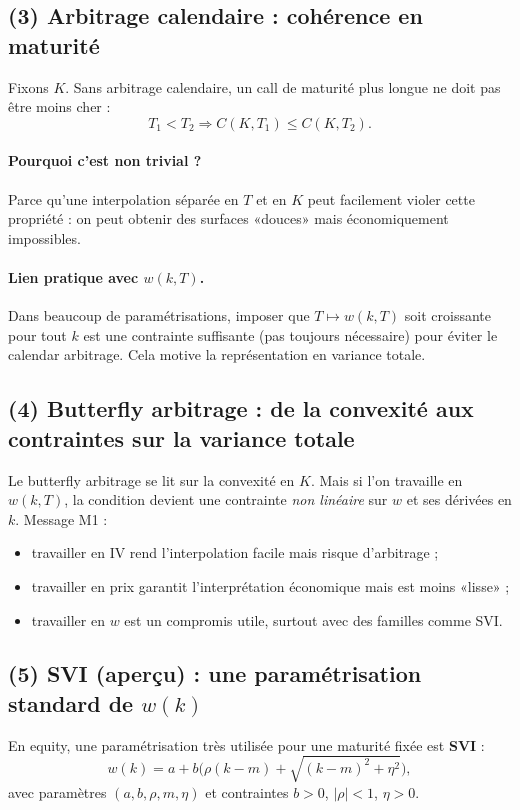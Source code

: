 \subsection*{(3) Arbitrage calendaire : cohérence en maturité}
Fixons $K$.
Sans arbitrage calendaire, un call de maturité plus longue ne doit pas être moins cher :
\[
T_1<T_2 \Rightarrow C(K,T_1)\le C(K,T_2).
\]
\paragraph{Pourquoi c'est non trivial ?}
Parce qu'une interpolation séparée en $T$ et en $K$ peut facilement violer cette propriété : on peut obtenir des surfaces «douces» mais économiquement impossibles.
\paragraph{Lien pratique avec $w(k,T)$.}
Dans beaucoup de paramétrisations, imposer que $T\mapsto w(k,T)$ soit croissante pour tout $k$ est une contrainte suffisante (pas toujours nécessaire) pour éviter le calendar arbitrage.
Cela motive la représentation en variance totale.

\subsection*{(4) Butterfly arbitrage : de la convexité aux contraintes sur la variance totale}
Le butterfly arbitrage se lit sur la convexité en $K$.
Mais si l'on travaille en $w(k,T)$, la condition devient une contrainte \emph{non linéaire} sur $w$ et ses dérivées en $k$.
Message M1 :
\begin{itemize}[leftmargin=*]
\item travailler en IV rend l'interpolation facile mais risque d'arbitrage ;
\item travailler en prix garantit l'interprétation économique mais est moins «lisse» ;
\item travailler en $w$ est un compromis utile, surtout avec des familles comme SVI.
\end{itemize}

\subsection*{(5) SVI (aperçu) : une paramétrisation standard de $w(k)$}
En equity, une paramétrisation très utilisée pour une maturité fixée est \textbf{SVI} :
\[
w(k)=a+b\Big(\rho(k-m)+\sqrt{(k-m)^2+\eta^2}\Big),
\]
avec paramètres $(a,b,\rho,m,\eta)$ et contraintes $b>0$, $|\rho|<1$, $\eta>0$.
